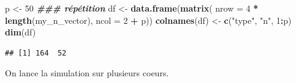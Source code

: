 \documentclass[
]{article}
\newenvironment{Shaded}{\begin{snugshade}}{\end{snugshade}}
\newcommand{\AttributeTok}[1]{\textcolor[rgb]{0.13,0.29,0.53}{#1}}
\newcommand{\DecValTok}[1]{\textcolor[rgb]{0.00,0.00,0.81}{#1}}
\newcommand{\DocumentationTok}[1]{\textcolor[rgb]{0.56,0.35,0.01}{\textbf{\textit{#1}}}}
\newcommand{\FunctionTok}[1]{\textcolor[rgb]{0.13,0.29,0.53}{\textbf{#1}}}
\newcommand{\NormalTok}[1]{#1}
\newcommand{\OtherTok}[1]{\textcolor[rgb]{0.56,0.35,0.01}{#1}}
\newcommand{\SpecialCharTok}[1]{\textcolor[rgb]{0.81,0.36,0.00}{\textbf{#1}}}
\newcommand{\StringTok}[1]{\textcolor[rgb]{0.31,0.60,0.02}{#1}}
\begin{document}
\begin{Shaded}
\begin{Highlighting}[]
\NormalTok{p }\OtherTok{\textless{}{-}} \DecValTok{50} \DocumentationTok{\#\#\# répétition}
\NormalTok{df }\OtherTok{\textless{}{-}} \FunctionTok{data.frame}\NormalTok{(}\FunctionTok{matrix}\NormalTok{( }\AttributeTok{nrow =} \DecValTok{4} \SpecialCharTok{*} \FunctionTok{length}\NormalTok{(my\_n\_vector), }\AttributeTok{ncol =} \DecValTok{2} \SpecialCharTok{+}\NormalTok{ p))}
\FunctionTok{colnames}\NormalTok{(df) }\OtherTok{\textless{}{-}} \FunctionTok{c}\NormalTok{(}\StringTok{"type"}\NormalTok{, }\StringTok{"n"}\NormalTok{, }\DecValTok{1}\SpecialCharTok{:}\NormalTok{p)}
\FunctionTok{dim}\NormalTok{(df)}
\end{Highlighting}
\end{Shaded}

\begin{verbatim}
## [1] 164  52
\end{verbatim}

On lance la simulation sur plusieurs coeurs.
\end{document}
